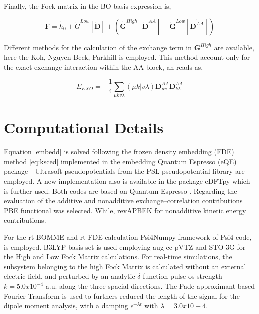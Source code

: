 \documentclass[notitlepage,12pt]{report}
\begin{document}
	Finally, the Fock matrix in the BO basis expression is,
	
	\begin{equation}
		\textbf{F} = \tilde{h}_0 + \tilde{G}^{Low}[\tilde{\textbf{D}}] +(\tilde{\textbf{G}}^{High}[\tilde{\textbf{D}}^{AA}]-\tilde{\textbf{G}}^{Low}[\tilde{\textbf{D}^{AA}}])
	\end{equation}
	
	Different methods for the calculation of the exchange term in $\textbf{G}^{High}$ are available, here the Koh, Nguyen-Beck, Parkhill is employed. This method account only for the exact exchange interaction within the AA block, an reads as,
	
	\begin{equation}
		E_{EXO}=-\frac{1}{4} \sum_{\mu kv\lambda} (\mu k|v\lambda) \textbf{D}_{\mu v}^{AA} \textbf{D}_{k \lambda}^{AA}
	\end{equation}
	
\section{Computational Details}

	Equation \ref{embedd} is solved following the frozen density embedding (FDE) method \ref{eq:ksced} implemented in the embedding Quantum Espresso (eQE) package \supercite{genova2017eqe}- Ultrasoft pseudopotentials from the PSL pseudopotential library \supercite{corso2014comput} are employed. A new implementation also is available in the package eDFTpy\supercite{edftpy} which is further used. Both codes are based on Quantum Espresso \supercite{qe}. Regarding the evaluation of the additive and nonadditive exchange--correlation contributions PBE functional \supercite{perdew1996phys} was selected. While, revAPBEK \supercite{laricchia2011generalized} for nonadditive kinetic energy contributions. 
	
	For the rt-BOMME and rt-FDE calculation Psi4Numpy\supercite{smith2018psi4numpy} framework of Psi4 code\supercite{smith2020psi4}, is employed. B3LYP basis set is used employing aug-cc-pVTZ and STO-3G for the High and Low Fock Matrix calculations. For real-time simulations, the subsystem belonging to the high Fock Matrix is calculated without an external electric field, and perturbed by an analytic $\delta$-function pulse os strength $k=5.0x10^{-4}$ a.u. along the three spacial directions. The Pade approximant-based Fourier Transform is used to furthers reduced the length of the signal for the dipole moment analysis, with a damping $\epsilon^{-\lambda \dot{t}}$ with $\lambda=3.0x10-4$. 
	
\end{document}
